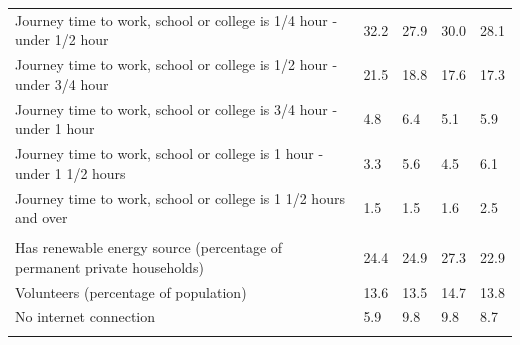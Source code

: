 \documentclass{article}
\begin{document}
\begin{table}[h]
\begin{tabular}{KTTTT}
Journey time to work, school or college is 1/4 hour - under 1/2 hour & 32.2& 27.9& 30.0& 28.1\\
Journey time to work, school or college is 1/2 hour - under 3/4 hour & 21.5& 18.8& 17.6& 17.3\\
Journey time to work, school or college is 3/4 hour - under 1 hour & 4.8& 6.4& 5.1& 5.9\\
Journey time to work, school or college is 1 hour - under 1 1/2 hours & 3.3& 5.6& 4.5& 6.1\\
Journey time to work, school or college is 1 1/2 hours and over & 1.5& 1.5& 1.6& 2.5\\
\hline
    \\ 
    \hline
Has renewable energy source (percentage of permanent private households) & 24.4& 24.9& 27.3& 22.9\\
    \hline
Volunteers (percentage of population) & 13.6& 13.5& 14.7& 13.8\\
    \hline
No internet connection& 5.9& 9.8& 9.8& 8.7\\
\hline
\end{tabular}
\end{table}
\end{document}
